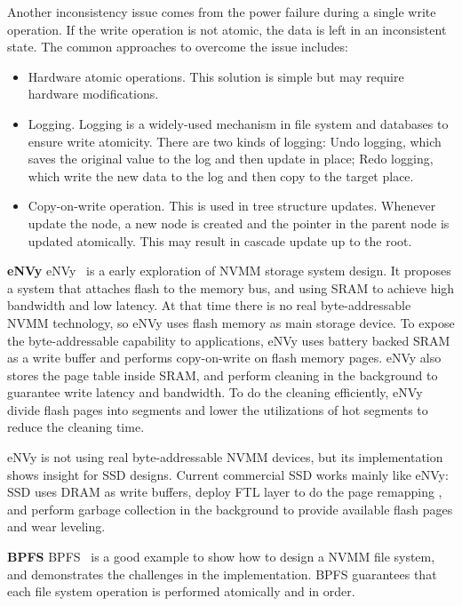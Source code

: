 Another inconsistency issue comes from the power failure during a single
write operation. If the write operation is not atomic, the data is left
in an inconsistent state. The common approaches to overcome the issue includes:

\begin{itemize}
\item Hardware atomic operations. This solution is simple but may require
hardware modifications.
\item Logging. Logging is a widely-used mechanism in file system and databases
to ensure write atomicity. There are two kinds of logging: Undo logging, which
saves the original value to the log and then update in place; Redo logging,
which write the new data to the log and then copy to the target place.
\item Copy-on-write operation. This is used in tree structure updates. Whenever
update the node, a new node is created and the pointer in the parent node is
updated atomically. This may result in cascade update up to the root.
\end{itemize}

\textbf{eNVy} eNVy~\cite{eNVy} is a early exploration of NVMM storage system
design. It proposes a system that attaches flash to the memory
bus, and using SRAM to achieve high bandwidth and low latency. At that time
there is no real byte-addressable NVMM technology, so eNVy uses flash memory
as main storage device. To expose the byte-addressable capability to 
applications, eNVy uses battery backed SRAM as a write buffer and performs
copy-on-write on flash memory pages. eNVy also stores the page table inside
SRAM, and perform cleaning in the background to guarantee write latency and
bandwidth. To do the cleaning efficiently, eNVy divide flash pages into
segments and lower the utilizations of hot segments to reduce the cleaning
time.

eNVy is not using real byte-addressable NVMM devices, but its implementation
shows insight for SSD designs. Current commercial SSD works mainly like
eNVy: SSD uses DRAM as write buffers, deploy FTL layer to do the page remapping
, and perform garbage collection in the background to provide available flash
pages and wear leveling.


\textbf{BPFS} BPFS~\cite{BPFS} is a good example to show how to design a NVMM
file system, and demonstrates the challenges in the implementation.
BPFS guarantees that
each file system operation is performed atomically and in order.

